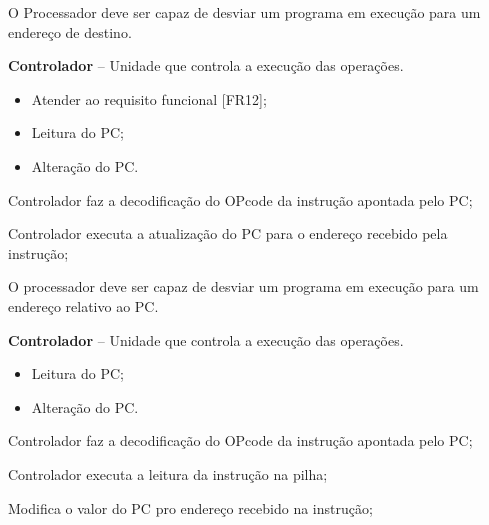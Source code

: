 \documentclass{article}
\begin{document}
  O Processador deve ser capaz de desviar um programa em execução para um endereço de destino.
  \actors
    \begin{description}
     \item \textbf{Controlador} – Unidade que controla a execução das operações.
    \end{description}
    
  \preconditions 
    \begin{itemize}
     \item Atender ao requisito funcional [FR12];
     \item Leitura do PC;
    \end{itemize}

  \postconditions
    \begin{itemize}
     \item Alteração do PC.
    \end{itemize}
  
  
  \begin{mainflow}
    \item Controlador faz a  decodificação do OPcode da instrução apontada pelo PC;
    \item Controlador executa a atualização do PC para o endereço recebido pela instrução;
  \end{mainflow}
  
  O processador deve ser capaz de desviar um programa em execução para um endereço relativo ao PC.
  \actors
  \begin{description}
  	\item \textbf{Controlador} – Unidade que controla a execução das operações.
  \end{description}
  
  \preconditions 
  \begin{itemize}
  	\item Leitura do PC;
  \end{itemize}
  
  \postconditions
  \begin{itemize}
  	\item Alteração do PC.
  \end{itemize}
  
  
  \begin{mainflow}
  	\item Controlador faz a  decodificação do OPcode da instrução apontada pelo PC;
          \item Controlador executa a leitura da instrução na pilha;
  	\item Modifica o valor do PC pro endereço recebido na instrução;
  \end{mainflow}
  
\end{document}

